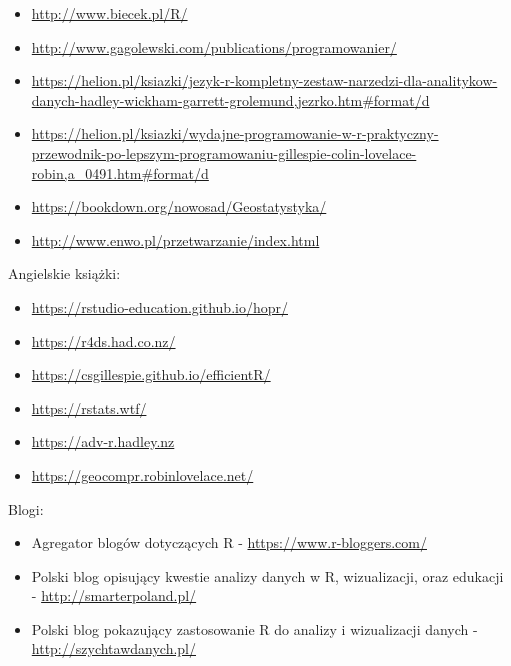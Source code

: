 \documentclass[paper=6in:9in,pagesize=pdftex,headinclude=on,footinclude=on,10pt]{scrbook}
\providecommand{\tightlist}{%
  \setlength{\itemsep}{0pt}\setlength{\parskip}{0pt}}
\begin{document}
\begin{itemize}
\tightlist
\item
  \url{http://www.biecek.pl/R/} \citep{biecekPrzewodnikPoPakiecie2014}
\item
  \url{http://www.gagolewski.com/publications/programowanier/} \citep{gagolewski2016programowanie}
\item
  \url{https://helion.pl/ksiazki/jezyk-r-kompletny-zestaw-narzedzi-dla-analitykow-danych-hadley-wickham-garrett-grolemund,jezrko.htm\#format/d} \citep{wickham2016r}
\item
  \url{https://helion.pl/ksiazki/wydajne-programowanie-w-r-praktyczny-przewodnik-po-lepszym-programowaniu-gillespie-colin-lovelace-robin,a_0491.htm\#format/d} \citep{gillespie2016efficient}
\item
  \url{https://bookdown.org/nowosad/Geostatystyka/} \citep{nowosadGeostatystyka2019}
\item
  \url{http://www.enwo.pl/przetwarzanie/index.html} \citep{czerneckiMetodyPrzetwarzaniaDanych2018}
\end{itemize}

Angielskie książki:

\begin{itemize}
\tightlist
\item
  \url{https://rstudio-education.github.io/hopr/} \citep{grolemund2014hands}
\item
  \url{https://r4ds.had.co.nz/} \citep{wickham2016r}
\item
  \url{https://csgillespie.github.io/efficientR/} \citep{gillespie2016efficient}
\item
  \url{https://rstats.wtf/} \citep{rstatswtf}
\item
  \url{https://adv-r.hadley.nz} \citep{wickham2014advanced}
\item
  \url{https://geocompr.robinlovelace.net/} \citep{lovelace2019geocomputation}
\end{itemize}

Blogi:

\begin{itemize}
\tightlist
\item
  Agregator blogów dotyczących R - \url{https://www.r-bloggers.com/}
\item
  Polski blog opisujący kwestie analizy danych w R, wizualizacji, oraz edukacji - \url{http://smarterpoland.pl/}
\item
  Polski blog pokazujący zastosowanie R do analizy i wizualizacji danych - \url{http://szychtawdanych.pl/}
\end{itemize}
\end{document}
